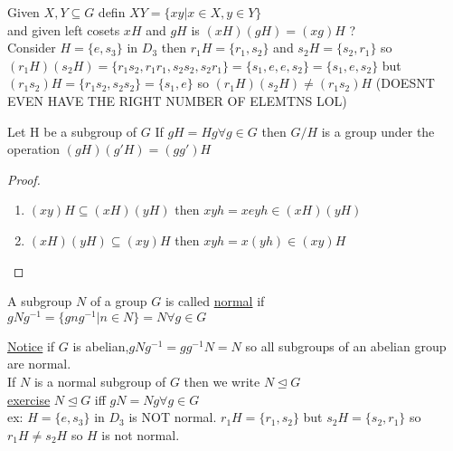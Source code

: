 \documentclass{article}
\begin{document}
Given $X, Y \subseteq G$ defin $XY = \{xy | x \in X, y \in Y \}$ \\ and given left cosets $xH$ and $gH$ is $(xH)(gH) = (xg)H$ ? \\ Consider $H = \{e, s_3\}$ in $D_3$ then $r_1H = \{r_1, s_2\}$ and $s_2H = \{s_2, r_1\}$ so $(r_1H)(s_2H) = \{r_1s_2, r_1r_1, s_2s_2, s_2r_1\} = \{s_1, e, e, s_2\} = \{s_1, e, s_2\}$ but $(r_1s_2)H = \{r_1s_2, s_2s_2\} = \{s_1, e\}$ so $(r_1H)(s_2H) \neq (r_1s_2)H$ (DOESNT EVEN HAVE THE RIGHT NUMBER OF ELEMTNS LOL)\\ 
\begin{proposition}[2.3.1]
    Let H be a subgroup of $G$ If $gH = Hg \forall g \in G$ then $G/H$ is a group under the operation $(gH)(g'H) = (gg')H$ 
    \begin{proof}\leavevmode \\ 
        \begin{enumerate}
            \item $ (xy)H \subseteq (xH)(yH) $ then $xyh = xeyh \in (xH)(yH)$
            \item $(xH)(yH) \subseteq (xy)H$ then $xyh = x(yh) \in (xy)H$
        \end{enumerate}
        
    \end{proof}
\end{proposition}
\begin{definition}
    A subgroup $N$ of a group $G$ is called \underline{normal} if $gNg^{-1} =  \{ gng^{-1} | n \in N \} = N \forall g \in G$ 
\end{definition}
\underline{ Notice} if $G$ is abelian,$gNg^{-1} = gg^{-1}N = N$ so all subgroups of an abelian group are normal. \\  If $N$ is a normal subgroup of $G$ then we write $N \trianglelefteq G$ \\

\underline{exercise} $N \trianglelefteq G $ iff $gN = Ng \forall g \in G$ \\
ex: $H = \{e, s_3\}$ in $D_3$ is NOT normal. $r_1H = \{r_1, s_2\}$ but $s_2H = \{s_2, r_1\}$ so $r_1H \neq s_2H$ so $H$ is not normal. \\
\end{document}
